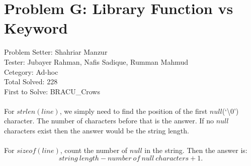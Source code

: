 \section*{Problem G: Library Function vs Keyword}
Problem Setter: Shahriar Manzur \\
Tester: Jubayer Rahman, Nafis Sadique, Rumman Mahmud \\
Cetegory: Ad-hoc \\
Total Solved: 228 \\
First to Solve: BRACU\_Crows \\
\\
For $strlen(line)$, we simply need to find the position of the first $null$(`\textbackslash 0') character.
The number of characters before that is the answer. If no $null$ characters exist then
the answer would be the string length.
\\ \\
For $sizeof(line)$, count the number of $null$ in the string. Then the answer is:
\begin{equation*}
    string\ length - number\ of\ null\ characters + 1.
\end{equation*}


